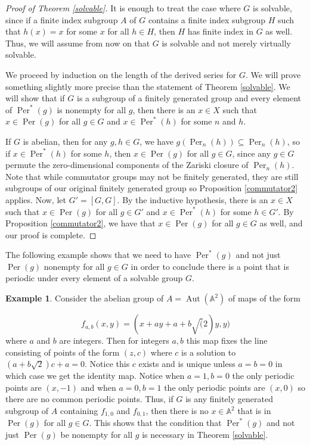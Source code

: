 \documentclass{amsart}
\newcommand{\bA} {\mathbb{A}}
\DeclareMathOperator{\Aut}{Aut}
\DeclareMathOperator{\Per}{Per}
\theoremstyle{definition}
\newtheorem{example}[thm]{Example}
\begin{document}
\begin{proof}[Proof of Theorem \ref{solvable}]

  It is enough to treat the case where $G$ is solvable, since if a
  finite index subgroup $A$ of $G$ contains a finite index subgroup
  $H$ such that $h(x) =x$ for some $x$ for all $h \in H$, then $H$ has
  finite index in $G$ as well.  Thus, we will assume from now on that
  $G$ is solvable and not merely virtually solvable. 
  

   
   We proceed by induction on the length of the derived series for
   $G$.  We will prove something slightly more precise than the
   statement of Theorem \ref{solvable}.  We will show that if $G$ is a
   subgroup of a finitely generated group and every element of
   $\Per^*(g)$ is nonempty for all $g$, then there is an $x \in X$
   such that $x \in \Per(g)$ for all $g \in G$ and $x \in \Per^*(h)$
   for some $n$ and $h$.  

   If $G$ is abelian, then for any $g, h \in G$, we have
   $g(\Per_n(h)) \subseteq \Per_n(h)$, so if $x \in \Per^{*}(h)$ for
   some $h$, then $x \in \Per(g)$ for all $g \in G$, since any
   $g \in G$ permute the zero-dimensional components of the Zariski closure of
   $\Per_n(h)$.  Note that while commutator groups may not be finitely
   generated, they are still subgroups of our original finitely
   generated group so Proposition \ref{commutator2} applies. Now, let
   $G' = [G,G]$.  By the inductive hypothesis, there is an
   $x \in X$ such that $x \in \Per(g)$ for all $g \in G'$ and
   $x \in \Per^*(h)$ for some $h \in G'$.
   By Proposition
   \ref{commutator2}, we have that $x \in \Per(g)$ for all $g \in G$
   as well, and our proof is complete.
 \end{proof}


 The following example shows that we need to have $\Per^*(g)$ and not
 just $\Per(g)$ nonempty for all $g \in G$ in order to conclude there
 is a point that is periodic under every element of a solvable group $G$.  
 

 \begin{example}\label{solv-ex}
Consider the abelian group of $A = \Aut(\bA^2)$ of maps of the form

\[ f_{a,b} (x,y)= (x+ay+a+b \sqrt(2)y,y) \] where $a$ and $b$ are
integers.  Then for integers $a,b$ this map fixes the line consisting
of points of the form $(z,c)$ where $c$ is a solution to
$(a+b \sqrt{2})c + a=0$. Notice this $c$ exists and is unique unless
$a=b=0$ in which case we get the identity map. Notice when $a=1, b=0$
the only periodic points are $(x,-1)$ and when $a=0, b=1$ the only
periodic points are $(x,0)$ so there are no common periodic points.
Thus, if $G$ is any finitely generated subgroup of $A$ containing
$f_{1,0}$ and $f_{0,1}$, then there is no $x \in \bA^2$ that is in
$\Per(g)$ for all $g \in G$. This shows that the condition that
$\Per^*(g)$ and not just $\Per(g)$ be nonempty for all $g$ is
necessary in Theorem \ref{solvable}.
\end{example}
\end{document}
